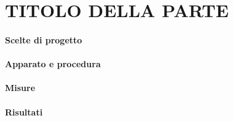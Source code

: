 \section{TITOLO DELLA PARTE}

\paragraph{Scelte di progetto}

\paragraph{Apparato e procedura}

\paragraph{Misure}

\paragraph{Risultati}
